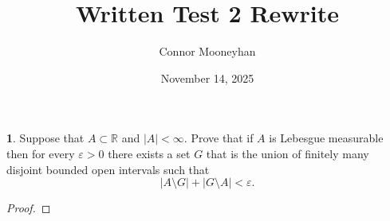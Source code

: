 \documentclass[12pt]{article}
\title{Written Test 2 Rewrite}
\author{Connor Mooneyhan}
\date{November 14, 2025}
\theoremstyle{definition}
\newtheorem{ex}{}
\newenvironment{exercise}[1]{
	\renewcommand{\theex}{#1}
	\begin{ex}
		}{\end{ex}}
\begin{document}
\maketitle

\begin{exercise}{1(a)}
	Suppose that $A \subset \mathbb{R}$ and $|A| < \infty$.
	Prove that if $A$ is Lebesgue measurable then for every $\varepsilon > 0$ there exists a set $G$ that is the union of finitely many disjoint bounded open intervals such that \begin{equation*}
		|A \setminus G| + |G \setminus A| < \varepsilon.
	\end{equation*}
\end{exercise}
\begin{proof}\end{proof}
\end{document}
